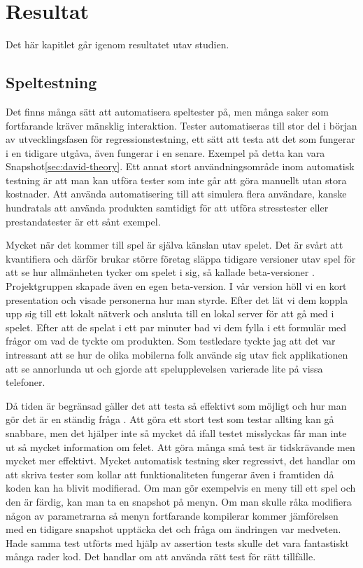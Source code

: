 \section{Resultat}
\label{sec:david-results}
Det här kapitlet går igenom resultatet utav studien.

\subsection{Speltestning}
Det finns många sätt att automatisera speltester på, men många saker som fortfarande kräver mänsklig interaktion. Tester automatiseras till stor del i början av utvecklingsfasen för regressionstestning, ett sätt att testa att det som fungerar i en tidigare utgåva, även fungerar i en senare. Exempel på detta kan vara Snapshot\ref{sec:david-theory}. Ett annat stort användningsområde inom automatisk testning är att man kan utföra tester som inte går att göra manuellt utan stora kostnader. Att använda automatisering till att simulera flera användare, kanske hundratals att använda produkten samtidigt för att utföra stresstester eller prestandatester är ett sånt exempel. \cite{book-sta}

Mycket när det kommer till spel är själva känslan utav spelet. Det är svårt att kvantifiera och därför brukar större företag släppa tidigare versioner utav spel för att se hur allmänheten tycker om spelet i sig, så kallade beta-versioner \cite{bib-beta-version-testing}. Projektgruppen skapade även en egen beta-version. I vår version höll vi en kort presentation och visade personerna hur man styrde. Efter det lät vi dem koppla upp sig till ett lokalt nätverk och ansluta till en lokal server för att gå med i spelet. Efter att de spelat i ett par minuter bad vi dem fylla i ett formulär med frågor om vad de tyckte om produkten. Som testledare tyckte jag att det var intressant att se hur de olika mobilerna folk använde sig utav fick applikationen att se annorlunda ut och gjorde att spelupplevelsen varierade lite på vissa telefoner.

Då tiden är begränsad gäller det att testa så effektivt som möjligt och hur man gör det är en ständig fråga \cite{bib-testing-time}. Att göra ett stort test som testar allting kan gå snabbare, men det hjälper inte så mycket då ifall testet misslyckas får man inte ut så mycket information om felet. Att göra många små test är tidskrävande men mycket mer effektivt. Mycket automatisk testning sker regressivt, det handlar om att skriva tester som kollar att funktionaliteten fungerar även i framtiden då koden kan ha blivit modifierad. Om man gör exempelvis en meny till ett spel och den är färdig, kan man ta en snapshot på menyn. Om man skulle råka modifiera någon av parametrarna så menyn fortfarande kompilerar kommer jämförelsen med en tidigare snapshot upptäcka det och fråga om ändringen var medveten. Hade samma test utförts med hjälp av assertion tests skulle det vara fantastiskt många rader kod. Det handlar om att använda rätt test för rätt tillfälle.

